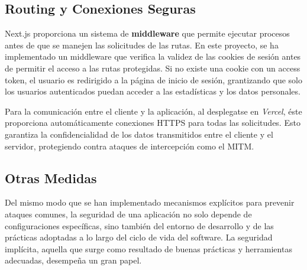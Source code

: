\subsection{Routing y Conexiones Seguras}


Next.js proporciona un sistema de \textbf{middleware} que permite ejecutar procesos antes de que se manejen las solicitudes de las rutas. En este proyecto, se ha implementado un middleware que verifica la validez de las cookies de sesión antes de permitir el acceso a las rutas protegidas. Si no existe una cookie con un access token, el usuario es redirigido a la página de inicio de sesión, grantizando que solo los usuarios autenticados puedan acceder a las estadísticas y los datos personales.

Para la comunicación entre el cliente y la aplicación, al desplegatse en \textit{Vercel}, éste proporciona automáticamente conexiones HTTPS para todas las solicitudes. Esto garantiza la confidencialidad de los datos transmitidos entre el cliente y el servidor, protegiendo contra ataques de intercepción como el MITM.

\subsection{Otras Medidas}

Del mismo modo que se han implementado mecanismos explícitos para prevenir ataques comunes, la seguridad de una aplicación no solo depende de configuraciones específicas, sino también del entorno de desarrollo y de las prácticas adoptadas a lo largo del ciclo de vida del software. La seguridad implícita, aquella que surge como resultado de buenas prácticas y herramientas adecuadas, desempeña un gran papel.

